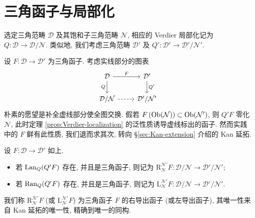 \section{三角函子与局部化}\label{sec:triangulated-functor-localization}
选定三角范畴 $\mathcal{D}$ 及其饱和子三角范畴 $\mathcal{N}$, 相应的 Verdier 局部化记为 $Q: \mathcal{D} \to \mathcal{D}/\mathcal{N}$. 类似地, 我们考虑三角范畴 $\mathcal{D}'$ 及 $Q': \mathcal{D}' \to \mathcal{D}'/\mathcal{N}'$.

设 $F: \mathcal{D} \to \mathcal{D}'$ 为三角函子. 考虑实线部分的图表
\begin{equation}\label{eqn:derived-situation}\begin{tikzcd}
	\mathcal{D} \arrow[r, "F"] \arrow[d, "Q"'] & \mathcal{D}' \arrow[d, "{Q'}"] \\
	\mathcal{D}/\mathcal{N} \arrow[dashed, r] & \mathcal{D}'/\mathcal{N}'
\end{tikzcd}\end{equation}
朴素的愿望是补全虚线部分使全图交换. 假若 $F\left( \operatorname{Ob}(\mathcal{N})\right) \subset \operatorname{Ob}(\mathcal{N}')$, 则 $Q'F$ 零化 $\mathcal{N}$, 此时定理 \ref{prop:Verdier-localization} 的泛性质诱导虚线标出的函子. 然而实践中的 $F$ 鲜有此性质, 我们退而求其次, 转向 \S\ref{sec:Kan-extension} 介绍的 Kan 延拓.

\begin{definition}[三角函子的导出函子]\label{def:Verdier-localization-functor}
	设 $F: \mathcal{D} \to \mathcal{D}'$ 如上.
	\begin{itemize}
		\item 若 $\operatorname{Lan}_Q(Q' F)$ 存在, 并且是三角函子, 则记为 $\mathrm{R}^{\mathcal{N}'}_{\mathcal{N}} F: \mathcal{D}/\mathcal{N} \to \mathcal{D}'/\mathcal{N}'$;
		\item 若 $\operatorname{Ran}_Q(Q' F)$ 存在, 并且是三角函子, 则记为 $\mathrm{L}^{\mathcal{N}'}_{\mathcal{N}} F: \mathcal{D}/\mathcal{N} \to \mathcal{D}'/\mathcal{N}'$.
	\end{itemize}
	我们称 $\mathrm{R}^{\mathcal{N}'}_{\mathcal{N}} F$ (或 $\mathrm{L}^{\mathcal{N}'}_{\mathcal{N}} F$) 为三角函子 $F$ 的右导出函子 (或左导出函子), 其唯一性来自 Kan 延拓的唯一性, 精确到唯一的同构.
\end{definition}

